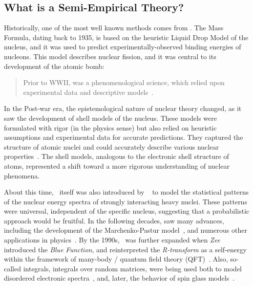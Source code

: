 \subsection{What is a Semi-Empirical Theory?}

Historically, one of the most well known \emph{\SemiEmpirical} methods comes from \NuclearPhysics.
The \SemiEmpirical Mass Formula, dating back to 1935, is based on the heuristic Liquid Drop Model of the nucleus,
and it was used to predict experimentally-observed binding energies of nucleons. 
This model describes nuclear fission, and it was central to its development of the atomic bomb:
\begin{quote}
  Prior to WWII, \NuclearPhysics was a phenomenological science, which relied upon experimental data and descriptive
  models~\cite{Negele05}.
\end{quote}
In the Post-war era, the epistemological nature of nuclear theory changed,
as it saw the development of \SemiEmpirical shell models of the nucleus.
These models were formulated with rigor (in the physics sense)
but also relied on heuristic assumptions and experimental data for accurate predictions.
They  captured  the structure of atomic nuclei
and could accurately describe various nuclear properties~\cite{Ivanenko1932, GoeppertMayer1949, Jensen1949}.
The shell models, analogous to the electronic shell structure of atoms,
represented a shift toward a more rigorous understanding of nuclear phenomena.

About this time, \RMT~itself was also introduced by \emph{\Wigner}~\cite{Wigner55}
to model the statistical patterns of the nuclear energy spectra of 
strongly interacting heavy nuclei.
These patterns were universal, independent of the specific nucleus,
suggesting that a probabilistic approach would be fruitful.
In the following decades, \RMT saw many advances, including the development of
the Marchenko-Pastur model~\cite{MarchenkoPastur1967},
and numerous other applications in physics~\cite{Guhr1998}.
By the 1990s, \RMT~was further expanded when \emph{Zee} introduced the \emph{Blue Function},
and reinterpreted the \emph{R-transform} as a self-energy within the
framework of many-body / quantum field theory (QFT)~\cite{Zee1996}.
Also, so-called \HCIZtext integrals, integrals over random matrices,
were being used both to model disordered electronic spectra~\cite{SchultenRMT},
and, later, the behavior of spin glass models~\cite{Bouchaud1998,Cherrier_2003}.

